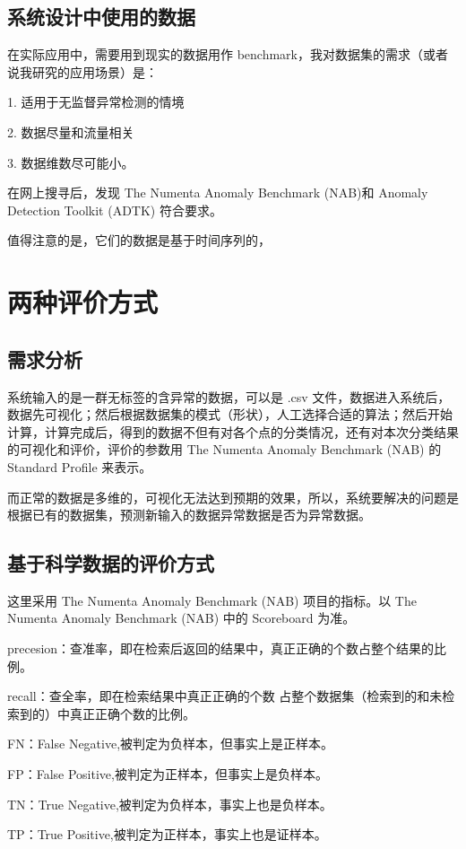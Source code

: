 \documentclass[UTF8]{ctexart}
\begin{document}
\subsection{系统设计中使用的数据}
在实际应用中，需要用到现实的数据用作 benchmark，我对数据集的需求（或者说我研究的应用场景）是：

1. 适用于无监督异常检测的情境

2. 数据尽量和流量相关

3. 数据维数尽可能小。

在网上搜寻后，发现 The Numenta Anomaly Benchmark (NAB)和 Anomaly Detection Toolkit (ADTK) 符合要求。

值得注意的是，它们的数据是基于时间序列的，

\section{两种评价方式}
\subsection{需求分析}
系统输入的是一群无标签的含异常的数据，可以是 .csv 文件，数据进入系统后，数据先可视化；然后根据数据集的模式（形状），人工选择合适的算法；然后开始计算，计算完成后，得到的数据不但有对各个点的分类情况，还有对本次分类结果的可视化和评价，评价的参数用 The Numenta Anomaly Benchmark (NAB) 的 Standard Profile 来表示。%

而正常的数据是多维的，可视化无法达到预期的效果，所以，系统要解决的问题是 根据已有的数据集，预测新输入的数据异常数据是否为异常数据。

\subsection{基于科学数据的评价方式}
这里采用 The Numenta Anomaly Benchmark (NAB) 项目的指标。以 The Numenta Anomaly Benchmark (NAB) 中的 Scoreboard 为准。

precesion：查准率，即在检索后返回的结果中，真正正确的个数占整个结果的比例。

recall：查全率，即在检索结果中真正正确的个数 占整个数据集（检索到的和未检索到的）中真正正确个数的比例。

FN：False Negative,被判定为负样本，但事实上是正样本。

FP：False Positive,被判定为正样本，但事实上是负样本。

TN：True Negative,被判定为负样本，事实上也是负样本。

TP：True Positive,被判定为正样本，事实上也是证样本。
\end{document}
